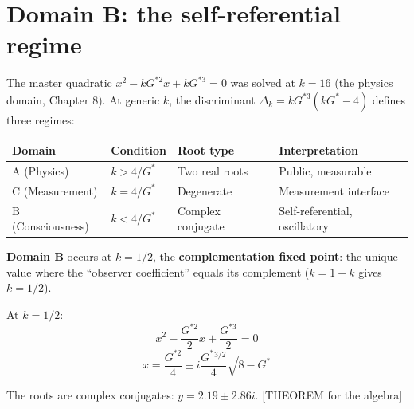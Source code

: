 \documentclass[
  11pt,
  letterpaper,
  twoside,
  openany]{book}
\makeatletter
\let\orig@section\section
\renewcommand{\section}{\needspace{8\baselineskip}\orig@section}
\newcommand{\Gs}{G^{*}{}}
\newcommand{\Gssq}{G^{*2}{}}      %
\newcommand{\Gscu}{G^{*3}{}}      %
\makeatother
\begin{document}
\section{Domain B: the self-referential
regime}\label{domain-b-the-self-referential-regime}

The master quadratic \(x^2 - k\Gssq x + k\Gscu = 0\) was solved at
\(k = 16\) (the physics domain, Chapter 8). At generic \(k\), the
discriminant \(\Delta_k = k\Gscu(k\Gs - 4)\) defines three regimes:

\begin{longtable}[]{@{}
  >{\raggedright\arraybackslash}p{}
  >{\raggedright\arraybackslash}p{}
  >{\raggedright\arraybackslash}p{}
  >{\raggedright\arraybackslash}p{}@{}}
\toprule\noalign{}
\begin{minipage}[b]{\linewidth}\raggedright
Domain
\end{minipage} & \begin{minipage}[b]{\linewidth}\raggedright
Condition
\end{minipage} & \begin{minipage}[b]{\linewidth}\raggedright
Root type
\end{minipage} & \begin{minipage}[b]{\linewidth}\raggedright
Interpretation
\end{minipage} \\
\midrule\noalign{}
\endhead
\bottomrule\noalign{}
\endlastfoot
A (Physics) & \(k > 4/\Gs\) & Two real roots & Public, measurable \\
C (Measurement) & \(k = 4/\Gs\) & Degenerate & Measurement interface \\
B (Consciousness) & \(k < 4/\Gs\) & Complex conjugate &
Self-referential, oscillatory \\
\end{longtable}

\textbf{Domain B} occurs at \(k = 1/2\), the \textbf{complementation
fixed point}: the unique value where the ``observer coefficient'' equals
its complement (\(k = 1 - k\) gives \(k = 1/2\)).

At \(k = 1/2\): \[
x^2 - \frac{\Gssq}{2}x + \frac{\Gscu}{2} = 0
\] \[
x = \frac{\Gssq}{4} \pm i\frac{\Gs^{3/2}}{4}\sqrt{8 - \Gs}
\]

The roots are complex conjugates: \(y = 2.19 \pm 2.86i\). {[}THEOREM for
the algebra{]}
\end{document}
